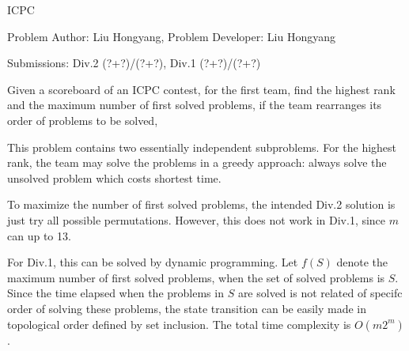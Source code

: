 \begin{Solution}{ICPC}

\begin{frame}{\ProblemName}

\small Problem Author: Liu Hongyang, Problem Developer: Liu Hongyang \par \vspace{0.3cm}

\small Submissions: Div.2 (?+?)/(?+?), Div.1 (?+?)/(?+?)  \par \vspace{0.5cm}

Given a scoreboard of an ICPC contest, for the first team, find the highest rank and the maximum number of first solved problems, if the team rearranges its order of problems to be solved,

\par

This problem contains two essentially independent subproblems. For the highest rank, the team may solve the problems in a greedy approach: always solve the unsolved problem which costs shortest time.

\par

To maximize the number of first solved problems, the intended Div.2 solution is just try all possible permutations. However, this does not work in Div.1, since $m$ can up to 13. 

\end{frame}

\begin{frame}{\ProblemName}

For Div.1, this can be solved by dynamic programming. Let $f(S)$ denote the maximum number of first solved problems, when the set of solved problems is $S$. Since the time elapsed when the problems in $S$ are solved is not related of specifc order of solving these problems, the state transition can be easily made in topological order defined by set inclusion. The total time complexity is $O(m2^m)$.

\end{frame}

\end{Solution}

